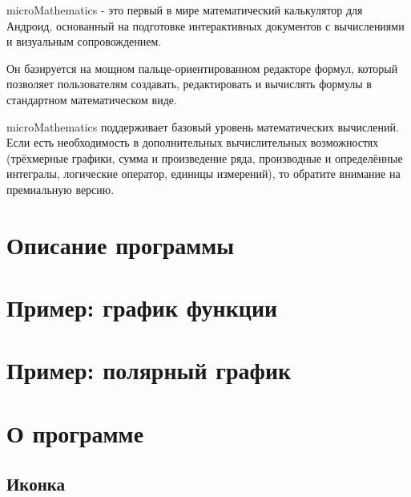 \documentclass[DIV=calc, paper=a4, fontsize=11pt, twocolumn]{scrartcl}
\begin{document}
\maketitle
\thispagestyle{fancy} %

\begin{bf}
microMathematics - это первый в
мире математический калькулятор
для Андроид, основанный на
подготовке интерактивных
документов с вычислениями и
визуальным сопровождением.

Он базируется на мощном
пальце-ориентированном редакторе
формул, который позволяет
пользователям создавать,
редактировать и вычислять формулы
в стандартном математическом виде.

microMathematics поддерживает
базовый уровень математических
вычислений. Если есть
необходимость в дополнительных
вычислительных возможностях
(трёхмерные графики, сумма и
произведение ряда, производные и
определённые интегралы, логические
оператор, единицы измерений), то
обратите внимание на премиальную
версию.
\end{bf}

\section{Описание программы}


\section{Пример: график функции}


\section{Пример: полярный график}


\section{О программе}

\subsection*{Иконка}
\end{document}
